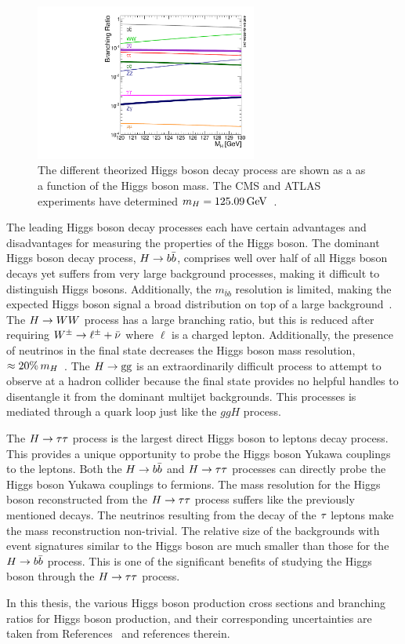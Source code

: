 \begin{figure}[htbp]
\centering
     \includegraphics[width=0.65\textwidth]{phenomenology_of_processes/plots/SMHiggsBR_YR4-square.pdf}
     \caption{
The different theorized Higgs boson decay process are shown as a 
as a function of the Higgs boson mass.
The CMS and ATLAS experiments have determined $m_{H} = 125.09\,\mathrm{GeV}$~\cite{Aad:2015zhl}.
     }
     \label{fig:higgs_decay}
\end{figure}

The leading Higgs boson decay processes each have certain advantages and disadvantages
for measuring the properties of the Higgs boson. The dominant Higgs boson decay 
process, $H\to b\bar{b}$, comprises well over half of all Higgs boson decays yet suffers
from very large background processes, making it difficult to distinguish Higgs bosons.
Additionally, the $m_{\bar{b}b}$ resolution is limited, making the expected Higgs boson
signal a broad distribution on top of a large background~\cite{PDG}.
The $H\to WW$ process has a large branching ratio, but this is reduced after requiring
$W^{\pm}\to\ell^{\pm} + \bar{\nu}$ where $\ell$ is a charged lepton. Additionally, the presence of neutrinos
in the final state decreases the Higgs boson mass resolution, $\approx 20\% \, m_{H}$~\cite{PDG}.
The $H\to\text{g}\text{g}$ is an extraordinarily difficult process to attempt to observe at a
hadron collider because the final state provides no helpful handles to disentangle it from
the dominant multijet backgrounds. This processes is mediated through a quark loop just
like the $ggH$ process.

The $H\to\tau\tau$ process is the largest direct Higgs boson to leptons decay process.
This provides a unique opportunity to probe the Higgs boson Yukawa couplings to the leptons.
Both the $H\to b\bar{b}$ and $H\to\tau\tau$ processes can directly probe the Higgs boson
Yukawa couplings to fermions. 
The mass resolution for the Higgs boson reconstructed from the $H\to\tau\tau$ process suffers like
the previously mentioned decays. The neutrinos resulting from the decay of the $\tau$
leptons make the mass reconstruction non-trivial.
The relative size of the backgrounds with event signatures similar to the Higgs boson
are much smaller than those for the $H\to b\bar{b}$ process. This is one
of the significant benefits of studying the Higgs boson through the $H\to\tau\tau$ process.

In this thesis, the various Higgs boson production cross sections and branching ratios
for Higgs boson production, and their corresponding uncertainties are taken from 
References~\cite{deFlorian:2016spz,Denner:2011mq,Ball:2011mu} and references therein.




